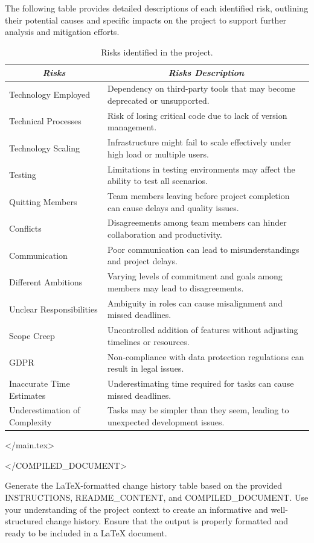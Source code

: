The following table provides detailed descriptions of each identified risk, outlining their potential causes and specific impacts on the project to support further analysis and mitigation efforts.

\begin{table}[h]
\centering
\begin{tabularx}{\linewidth}{|l|X|}
\hline
\multicolumn{1}{|c|}{\textit{\textbf{Risks}}} & \multicolumn{1}{c|}{\textit{\textbf{Risks Description}}}                                                   \tabularnewline \hline
 Technology Employed & Dependency on third-party tools that may become deprecated or unsupported.\tabularnewline \hline
 Technical Processes & Risk of losing critical code due to lack of version management.\tabularnewline \hline
 Technology Scaling & Infrastructure might fail to scale effectively under high load or multiple users.\tabularnewline \hline
 Testing & Limitations in testing environments may affect the ability to test all scenarios.\tabularnewline \hline
 Quitting Members & Team members leaving before project completion can cause delays and quality issues.\tabularnewline \hline
 Conflicts & Disagreements among team members can hinder collaboration and productivity.\tabularnewline \hline
 Communication & Poor communication can lead to misunderstandings and project delays.\tabularnewline \hline
 Different Ambitions & Varying levels of commitment and goals among members may lead to disagreements.\tabularnewline \hline
 Unclear Responsibilities & Ambiguity in roles can cause misalignment and missed deadlines.\tabularnewline \hline
 Scope Creep & Uncontrolled addition of features without adjusting timelines or resources.\tabularnewline \hline
 GDPR & Non-compliance with data protection regulations can result in legal issues.\tabularnewline \hline
 Inaccurate Time Estimates & Underestimating time required for tasks can cause missed deadlines.\tabularnewline \hline
 Underestimation of Complexity & Tasks may be simpler than they seem, leading to unexpected development issues.\tabularnewline \hline

\end{tabularx}
\caption{Risks identified in the project.}
\label{table:risks}   
\end{table}
\pagebreak
</main.tex>


</COMPILED_DOCUMENT>

Generate the LaTeX-formatted change history table based on the provided INSTRUCTIONS, README_CONTENT, and COMPILED_DOCUMENT. Use your understanding of the project context to create an informative and well-structured change history. Ensure that the output is properly formatted and ready to be included in a LaTeX document.
  